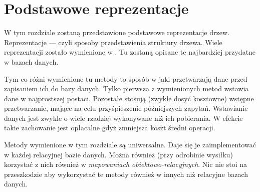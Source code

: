 \chapter{Podstawowe reprezentacje}

W tym rozdziale zostaną przedstawione podstawowe reprezentacje drzew.
Reprezentacje --- czyli sposoby przedstawienia struktury drzewa.
Wiele reprezentacji zostało wymienione w \cite{knuth}.
Tu zostaną opisane te najbardziej przydatne w bazach danych.




Tym co różni wymienione tu metody to sposób w jaki przetwarzają dane przed zapisaniem ich do bazy danych.
Tylko pierwsza z wymienionych metod wstawia dane w najprostszej postaci.
Pozostałe stosują (zwykle dosyć kosztowne) wstępne przetwarzanie, 
mające na celu przyśpieszenie późniejszych zapytań.
Wstawianie danych jest zwykle o wiele rzadziej wykonywane niż ich pobierania.
W efekcie takie zachowanie jest opłacalne gdyż zmniejsza koszt średni operacji.


Metody wymienione w tym rozdziale są uniwersalne.
Daje się je zaimplementować w każdej relacyjnej bazie danych. 
Można również (przy odrobinie wysiłku) korzystać z nich również w \emph{mapowaniach obiektowo-relacyjnych}.
Nic nie stoi na przeszkodzie aby wykorzystać te metody również w innych niż relacyjne bazach danych.


